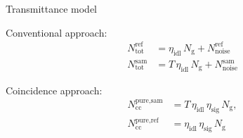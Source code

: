 \documentclass[10pt,aspectratio=43]{beamer}
\newcommand{\myvect}[1]{\accentset{\rightharpoonup}{#1}}
\begin{document}
%						
%					

	\begin{frame}{Transmittance model}
		\begin{minipage}{.4\textwidth}
			\centering
			Conventional approach:
			\begin{equation}
				\begin{aligned}
					N_{\text{tot}}^{\text{ref}} &= \eta_{\text{idl}} \, N_{\mathrm{g}} 	+ N_{\text{noise}}^{\text{ref}} \\[0.5em]
					N_{\text{tot}}^{\text{sam}} &= T \, \eta_{\text{idl}} \, 	N_{\mathrm{g}} + N_{\text{noise}}^{\text{sam}}
				\end{aligned}
				\label{eq:SingleSam}
				\nonumber
			\end{equation}
		\end{minipage}
		\hfill
		\begin{minipage}{.4\textwidth}
			\centering
			Coincidence approach:
			\begin{equation}
				\begin{aligned}
					N_{\text{cc}}^{\text{pure,sam}} &= T \,\eta_{\text{idl}} \,\eta_{\text{sig}} \, N_{\mathrm{g}}, \\[0.5em]
					N_{\text{cc}}^{\text{pure,ref}} &= \eta_{\text{idl}} \,\eta_{\text{sig}} \, N_{\mathrm{g}}
				\end{aligned}
				\label{eq:pureCoinc}
				\nonumber
			\end{equation}
		\end{minipage}
	\end{frame}
	
\end{document}
